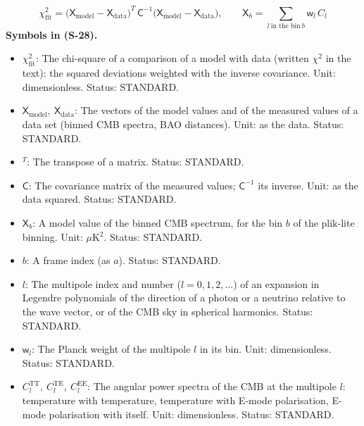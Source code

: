 \documentclass[
  10pt,
]{article}
\providecommand{\tightlist}{%
  \setlength{\itemsep}{0pt}\setlength{\parskip}{0pt}}
\begin{document}
\[
\chi_{\mathrm{fit}}^2 = \big(\mathsf{X}_{\mathrm{model}} - \mathsf{X}_{\mathrm{data}}\big)^T\,\mathsf{C}^{-1}\big(\mathsf{X}_{\mathrm{model}} - \mathsf{X}_{\mathrm{data}}\big),\qquad
\mathsf{X}_b = \sum_{l\ \text{in the bin}\ b}\mathsf{w}_{l}\,C_l \tag{S-28}
\] \textbf{Symbols in (S-28).}

\begin{itemize}
\tightlist
\item
  \(\chi_{\mathrm{fit}}^2\): The chi-square of a comparison of a model
  with data (written \(\chi^2\) in the text): the squared deviations
  weighted with the inverse covariance. Unit: dimensionless. Status:
  STANDARD.
\item
  \(\mathsf{X}_{\mathrm{model}},\ \mathsf{X}_{\mathrm{data}}\): The
  vectors of the model values and of the measured values of a data set
  (binned CMB spectra, BAO distances). Unit: as the data. Status:
  STANDARD.
\item
  \({}^T\): The transpose of a matrix. Status: STANDARD.
\item
  \(\mathsf{C}\): The covariance matrix of the measured values;
  \(\mathsf{C}^{-1}\) its inverse. Unit: as the data squared. Status:
  STANDARD.
\item
  \(\mathsf{X}_b\): A model value of the binned CMB spectrum, for the
  bin \(b\) of the plik-lite binning. Unit: \(\mu\)K\(^2\). Status:
  STANDARD.
\item
  \(b\): A frame index (as \(a\)). Status: STANDARD.
\item
  \(l\): The multipole index and number (\(l = 0, 1, 2, \dots\)) of an
  expansion in Legendre polynomials of the direction of a photon or a
  neutrino relative to the wave vector, or of the CMB sky in spherical
  harmonics. Status: STANDARD.
\item
  \(\mathsf{w}_l\): The Planck weight of the multipole \(l\) in its bin.
  Unit: dimensionless. Status: STANDARD.
\item
  \(C_l^{\mathrm{TT}},\ C_l^{\mathrm{TE}},\ C_l^{\mathrm{EE}}\): The
  angular power spectra of the CMB at the multipole \(l\): temperature
  with temperature, temperature with E-mode polarisation, E-mode
  polarisation with itself. Unit: dimensionless. Status: STANDARD.
\end{itemize}
\end{document}
